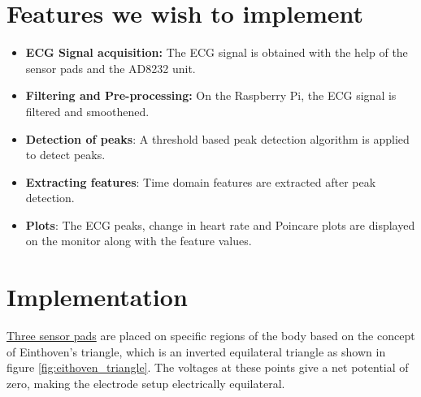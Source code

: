 \documentclass[11pt]{article}
\theoremstyle{definition}
\begin{document}
  \section{Features we wish to implement}
  \begin{itemize}
    \item \textbf{ECG Signal acquisition:} The ECG signal is obtained with the help of the sensor pads and the AD8232 unit.
    \item \textbf{Filtering and Pre-processing:} On the Raspberry Pi, the ECG signal is filtered and smoothened.
    \item \textbf{Detection of peaks}: A threshold based peak detection algorithm is applied to detect peaks.
    \item \textbf{Extracting features}: Time domain features are extracted after peak detection.
    \item \textbf{Plots}: The ECG peaks, change in heart rate and Poincare plots are displayed on the monitor along with the feature values.
  \end{itemize}


  \newpage
  \section{Implementation}
  \underline{Three sensor pads} are placed on specific regions of the body based on the concept of Einthoven’s triangle\cite{abi2019einthoven}, which is an inverted equilateral triangle as shown in figure \ref{fig:eithoven_triangle}. The voltages at these points give a net potential of zero, making the electrode setup electrically equilateral.
\end{document}
